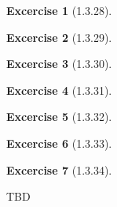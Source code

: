 \documentclass{article}
\theoremstyle{definition}
\newtheorem*{excercise}{Excercise}
\begin{document}
\begin{excercise}[1.3.28] %

\end{excercise}

\begin{excercise}[1.3.29] %

\end{excercise}

\begin{excercise}[1.3.30] %

\end{excercise}

\begin{excercise}[1.3.31] %

\end{excercise}

\begin{excercise}[1.3.32] %

\end{excercise}

\begin{excercise}[1.3.33] %

\end{excercise}

\begin{excercise}[1.3.34] %

\end{excercise}




\pagebreak
TBD
\end{document}
